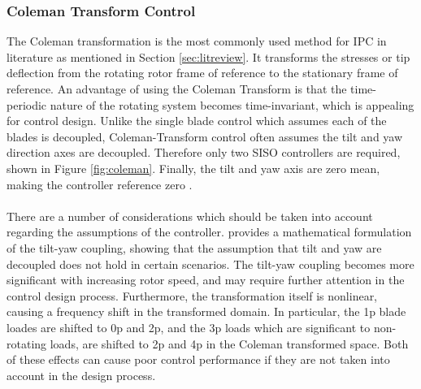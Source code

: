 \subsubsection{Coleman Transform Control}
The Coleman transformation is the most commonly used method for IPC in literature as mentioned in Section \ref{sec:litreview}. It transforms the stresses or tip deflection from the rotating rotor frame of reference to the stationary frame of reference. An advantage of using the Coleman Transform is that the time-periodic nature of the rotating system becomes time-invariant, which is appealing for control design. Unlike the single blade control which assumes each of the blades is decoupled, Coleman-Transform control often assumes the tilt and yaw direction axes are decoupled. Therefore only two SISO controllers are required, shown in Figure \ref{fig:coleman}. Finally, the tilt and yaw axis are zero mean, making the controller reference zero \citep{19_Lio}. \\~\\
There are a number of considerations which should be taken into account regarding the assumptions of the controller. \citet{1_Lu} provides a mathematical formulation of the tilt-yaw coupling, showing that the assumption that tilt and yaw are decoupled does not hold in certain scenarios. The tilt-yaw coupling becomes more significant with increasing rotor speed, and may require further attention in the control design process. Furthermore, the transformation itself is nonlinear, causing a frequency shift in the transformed domain. In particular, the 1p blade loades are shifted to 0p and 2p, and the 3p loads which are significant to non-rotating loads, are shifted to 2p and 4p in the Coleman transformed space. Both of these effects can cause poor control performance if they are not taken into account in the design process.
